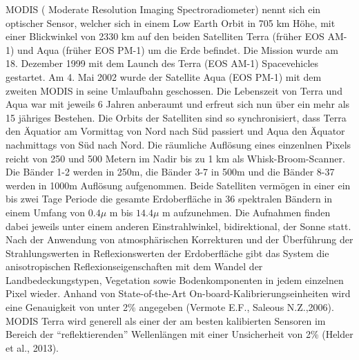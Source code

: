 \documentclass[11pt]{report}
\begin{document}
MODIS ( Moderate Resolution Imaging Spectroradiometer) nennt sich ein optischer Sensor, welcher sich in einem Low Earth Orbit in 705 km Höhe, mit einer Blickwinkel von 2330 km auf den beiden Satelliten Terra (früher EOS AM-1) und Aqua (früher EOS PM-1) um die Erde befindet. Die Mission wurde am 18. Dezember 1999 mit dem Launch des Terra (EOS AM-1) Spacevehicles gestartet. Am 4. Mai 2002 wurde der Satellite Aqua (EOS PM-1) mit dem zweiten MODIS in seine Umlaufbahn geschossen. Die Lebenszeit von Terra und Aqua war mit jeweils 6 Jahren anberaumt und erfreut sich nun über ein mehr als 15 jähriges Bestehen. Die Orbits der Satelliten sind so synchronisiert, dass Terra den Äquatior am Vormittag von Nord nach Süd passiert und Aqua den Äquator nachmittags von Süd nach Nord. Die räumliche Auflösung eines einzenlnen Pixels reicht von 250 und 500 Metern im Nadir bis zu 1 km als Whisk-Broom-Scanner. Die Bänder 1-2 werden in 250m, die Bänder 3-7 in 500m und die Bänder 8-37 werden in 1000m Auflösung aufgenommen. Beide Satelliten vermögen in einer ein bis zwei Tage Periode die gesamte Erdoberfläche in 36 spektralen Bändern in einem Umfang von $0.4\mu$ m bis $14.4\mu$ m aufzunehmen. Die Aufnahmen finden dabei jeweils unter einem anderen Einstrahlwinkel, bidirektional,  der Sonne statt. Nach der Anwendung von atmosphärischen Korrekturen und der Überführung der Strahlungswerten in Reflexionswerten der Erdoberfläche gibt das System die anisotropischen Reflexionseigenschaften mit dem Wandel der Landbedeckungstypen, Vegetation sowie Bodenkomponenten  in jedem einzelnen Pixel wieder. Anhand von State-of-the-Art On-board-Kalibrierungseinheiten wird eine Genauigkeit von unter 2\% angegeben (Vermote E.F., Saleous N.Z.,2006). MODIS Terra wird generell als einer der am besten kalibierten Sensoren im Bereich der "`reflektierenden"' Wellenlängen mit einer Unsicherheit von 2\% (Helder et al., 2013).
\newline
\end{document}
